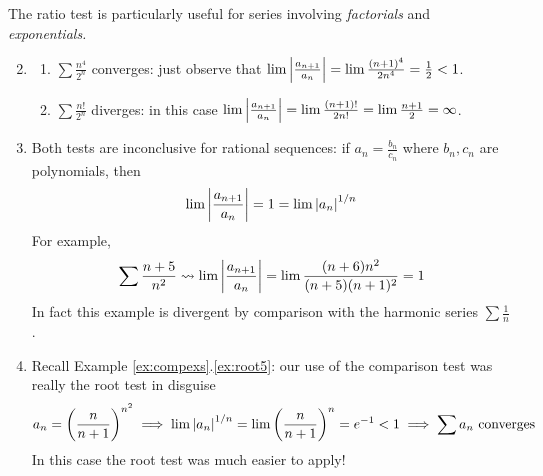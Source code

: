 \begin{examples}{}{}
\exstart The ratio test is particularly useful for series involving \emph{factorials} and \emph{exponentials.}
\begin{enumerate}\setcounter{enumi}{1}
	\item[]\begin{enumerate}
	  \item $\sum\frac{n^4}{2^n}$ converges: just observe that $\lim\left| \frac{a_{n+1}}{a_n}\right|=\lim\frac{(n+1)^4}{2n^4}=\frac 12<1$.
		\item $\sum\frac{n!}{2^n}$ diverges: in this case $\lim\left| \frac{a_{n+1}}{a_n}\right| =\lim\frac{(n+1)!}{2n!}=\lim \frac{n+1}2=\infty$.
	\end{enumerate}
	
	\item Both tests are inconclusive for rational sequences: if $a_n=\frac{b_n}{c_n}$ where $b_n,c_n$ are polynomials, then
	\[\lim\left| \frac{a_{n+1}}{a_n}\right|=1=\lim\left| a_n\right|^{1/n}\]
	For example,
	\[\sum\frac{n+5}{n^2}\rightsquigarrow \lim\left| \frac{a_{n+1}}{a_n}\right| =\lim \frac{(n+6)n^2}{(n+5)(n+1)^2}=1\]
	In fact this example is divergent by comparison with the harmonic series $\sum \frac 1n$.
	
	
	\item Recall Example \ref*{ex:compexs}.\ref{ex:root5}: our use of the comparison test was really the root test in disguise
	\[a_n=\left(\frac n{n+1}\right)^{n^2}\implies \lim\left| a_n\right|^{1/n}= \lim\left(\frac n{n+1}\right)^{n}=e^{-1}<1 \implies \sum a_n\text{ converges}\]
	In this case the root test was much easier to apply!
	
	\goodbreak
	

\end{enumerate}
\end{examples}

